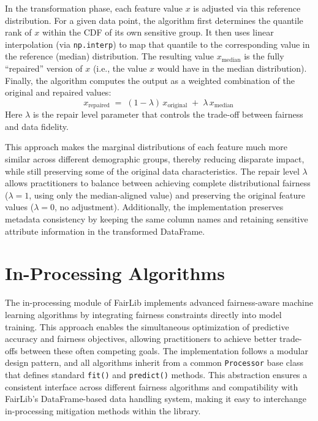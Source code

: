 \documentclass[12pt,a4paper,openright,twoside]{book}
\begin{document}
In the transformation phase, each feature value $x$ is adjusted via this reference distribution. For a given data point, the algorithm first determines the quantile rank of $x$ within the CDF of its own sensitive group. It then uses linear interpolation (via \texttt{np.interp}) to map that quantile to the corresponding value in the reference (median) distribution. The resulting value $x_{\text{median}}$ is the fully “repaired” version of $x$ (i.e., the value $x$ would have in the median distribution). Finally, the algorithm computes the output as a weighted combination of the original and repaired values: 
\[ 
x_{\text{repaired}} \;=\; (1 - \lambda)\,x_{\text{original}} \;+\; \lambda\,x_{\text{median}}\,
\] 
Here $\lambda$ is the repair level parameter that controls the trade-off between fairness and data fidelity.

This approach makes the marginal distributions of each feature much more similar across different demographic groups, thereby reducing disparate impact, while still preserving some of the original data characteristics. The repair level $\lambda$ allows practitioners to balance between achieving complete distributional fairness ($\lambda = 1$, using only the median-aligned value) and preserving the original feature values ($\lambda = 0$, no adjustment). Additionally, the implementation preserves metadata consistency by keeping the same column names and retaining sensitive attribute information in the transformed DataFrame.

\section{In-Processing Algorithms}
The in-processing module of FairLib implements advanced fairness-aware machine learning algorithms by integrating fairness constraints directly into model training. This approach enables the simultaneous optimization of predictive accuracy and fairness objectives, allowing practitioners to achieve better trade-offs between these often competing goals. The implementation follows a modular design pattern, and all algorithms inherit from a common \texttt{Processor} base class that defines standard \texttt{fit()} and \texttt{predict()} methods. This abstraction ensures a consistent interface across different fairness algorithms and compatibility with FairLib’s DataFrame-based data handling system, making it easy to interchange in-processing mitigation methods within the library.
\end{document}
